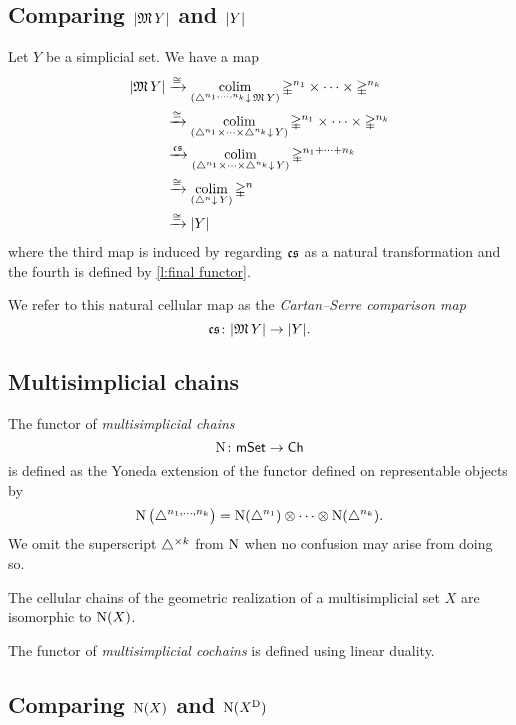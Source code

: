\subsection{Comparing $\lvert\operatorname{\mathfrak{M}} Y\rvert$ and $\lvert Y\rvert$}

Let $Y$ be a simplicial set.
We have a map
\[
\begin{split}
\lvert\operatorname{\mathfrak{M}} Y\rvert & \xrightarrow{\cong}
\operatorname*{colim}_{(\triangle^{n_1, \dots, n_k} \downarrow \, \operatorname{\mathfrak{M}} Y)} \mathbb{\Delta}^{n_1} \times \cdots \times \mathbb{\Delta}^{n_k} \\ & \xrightarrow{\cong}
\operatorname*{colim}_{(\triangle^{n_1} \times \dots \times \triangle^{n_k} \downarrow \, Y)} \mathbb{\Delta}^{n_1} \times \cdots \times \mathbb{\Delta}^{n_k} \\ & \xrightarrow{\operatorname{\mathfrak{cs}}}
\operatorname*{colim}_{(\triangle^{n_1} \times \dots \times \triangle^{n_k} \downarrow \, Y)} \mathbb{\Delta}^{n_1 + \dots + n_k} \\ & \xrightarrow{\cong}
\operatorname*{colim}_{(\triangle^{n} \downarrow \, Y)} \mathbb{\Delta}^{n} \\ & \xrightarrow{\cong}
\lvert Y\rvert
\end{split}
\]
where the third map is induced by regarding $\operatorname{\mathfrak{cs}}$ as a natural transformation and the fourth is defined by \cref{l:final functor}.


We refer to this natural cellular map as the \textit{Cartan--Serre comparison map}
\[
\operatorname{\mathfrak{cs}} \colon \lvert\operatorname{\mathfrak{M}} Y\rvert \to \lvert Y\rvert.
\]

\subsection{Multisimplicial chains}

The functor of \textit{multisimplicial chains}
\[
\operatorname{N} \colon \mathsf{mSet} \to \mathsf{Ch}
\]
is defined as the Yoneda extension of the functor defined on representable objects by
\[
\operatorname{N} \big( \triangle^{n_1, \dots, n_k} \big) =
\operatorname{N}(\triangle^{n_1}) \otimes \dotsb \otimes \operatorname{N}(\triangle^{n_k}).
\]
We omit the superscript $\triangle^{\times k}$ from $\operatorname{N}$ when no confusion may arise from doing so.

The cellular chains of the geometric realization of a multisimplicial set $X$ are isomorphic to $\operatorname{N}(X)$.

The functor of \textit{multisimplicial cochains} is defined using linear duality.

\subsection{Comparing $\operatorname{N}(X)$ and $\operatorname{N}(X^{\operatorname{D}})$}

